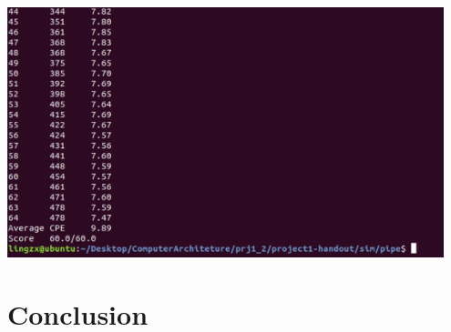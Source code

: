 \documentclass{article}
\begin{document}
\begin{enumerate}
  \includegraphics[width=0.95\textwidth]{pipe_CPE.png}
\end{enumerate}

\section{Conclusion}
\end{document}
